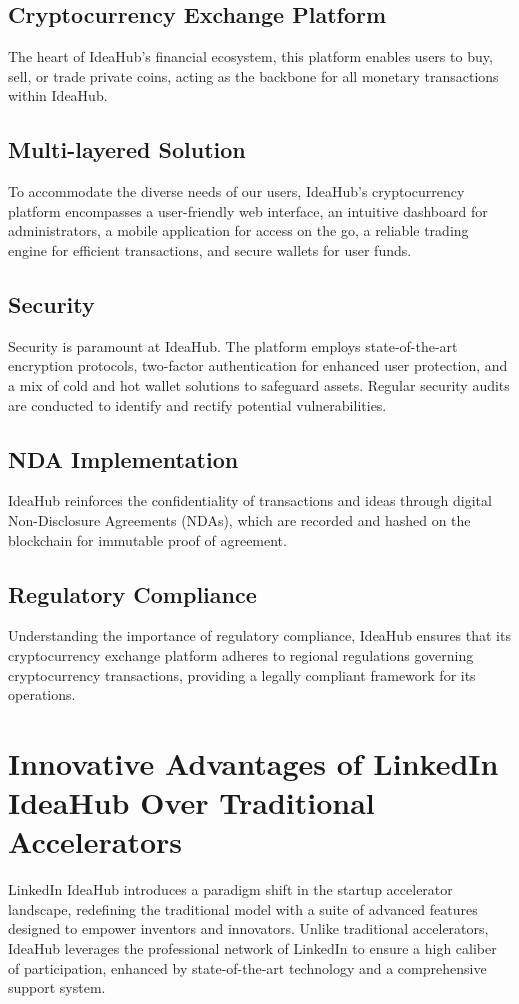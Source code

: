 \documentclass{article}
\begin{document}
	\subsection{Cryptocurrency Exchange Platform}
	The heart of IdeaHub's financial ecosystem, this platform enables users to buy, sell, or trade private coins, acting as the backbone for all monetary transactions within IdeaHub.
	
	\subsection{Multi-layered Solution}
	To accommodate the diverse needs of our users, IdeaHub's cryptocurrency platform encompasses a user-friendly web interface, an intuitive dashboard for administrators, a mobile application for access on the go, a reliable trading engine for efficient transactions, and secure wallets for user funds.
	
	\subsection{Security}
	Security is paramount at IdeaHub. The platform employs state-of-the-art encryption protocols, two-factor authentication for enhanced user protection, and a mix of cold and hot wallet solutions to safeguard assets. Regular security audits are conducted to identify and rectify potential vulnerabilities.
	
	\subsection{NDA Implementation}
	IdeaHub reinforces the confidentiality of transactions and ideas through digital Non-Disclosure Agreements (NDAs), which are recorded and hashed on the blockchain for immutable proof of agreement.
	
	\subsection{Regulatory Compliance}
	Understanding the importance of regulatory compliance, IdeaHub ensures that its cryptocurrency exchange platform adheres to regional regulations governing cryptocurrency transactions, providing a legally compliant framework for its operations.
		
	
	\section{Innovative Advantages of LinkedIn IdeaHub Over Traditional Accelerators}
	LinkedIn IdeaHub introduces a paradigm shift in the startup accelerator landscape, redefining the traditional model with a suite of advanced features designed to empower inventors and innovators. Unlike traditional accelerators, IdeaHub leverages the professional network of LinkedIn to ensure a high caliber of participation, enhanced by state-of-the-art technology and a comprehensive support system.
	
\end{document}
